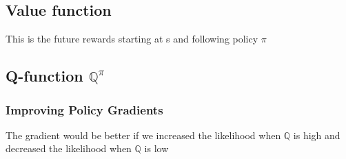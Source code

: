 \documentclass[../../../include/open-logic-chapter]{subfiles}
\begin{document}

\subsection{Value function}

This is the future rewards starting at s and following policy $\pi$


\subsection{Q-function $\mathbb{Q}^{\pi}$}


\subsubsection{Improving Policy Gradients}

The gradient would be better if we increased the likelihood when $\mathbb{Q}$ is high and decreased the
likelihood when $\mathbb{Q}$ is low
\end{document}
